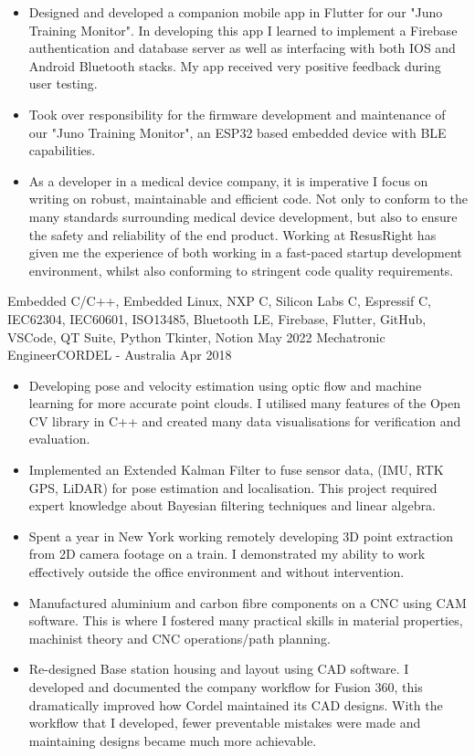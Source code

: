 \begin{experiences}
{\begin{itemize}
			\item Designed and developed a companion mobile app in Flutter for our "Juno Training Monitor". In developing this app I learned to implement a Firebase authentication and database server as well as interfacing with both IOS and Android Bluetooth stacks. My app received very positive feedback during user testing.
			\item Took over responsibility for the firmware development and maintenance of our "Juno Training Monitor", an ESP32 based embedded device with BLE capabilities. 
			\item As a developer in a medical device company, it is imperative I focus on writing on robust, maintainable and efficient code. Not only to conform to the many standards surrounding medical device development, but also to ensure the safety and reliability of the end product. Working at ResusRight has given me the experience of both working in a fast-paced startup development environment, whilst also conforming to stringent code quality requirements.
		\end{itemize}
	}
	{Embedded C/C++, Embedded Linux, NXP \mu C, Silicon Labs \mu C, Espressif \mu C, IEC62304, IEC60601, ISO13485, Bluetooth LE, Firebase, Flutter, GitHub, VSCode, QT Suite, Python Tkinter, Notion}
\emptySeparator
	\experience
		{May 2022}	{Mechatronic Engineer}{CORDEL - Australia}
		{Apr 2018}	{
			\begin{itemize}
				\item Developing pose and velocity estimation using optic flow and machine learning for more accurate point clouds. I utilised many features of the Open CV library in C++ and created many data visualisations for verification and evaluation.
				\item Implemented an Extended Kalman Filter to fuse sensor data, (IMU, RTK GPS, LiDAR) for pose estimation and localisation. This project required expert knowledge about Bayesian filtering techniques and linear algebra.
				\item Spent a year in New York working remotely developing 3D point extraction from 2D camera footage on a train. I demonstrated my ability to work effectively outside the office environment and without intervention.
				\item Manufactured aluminium and carbon fibre components on a CNC using CAM software. This is where I fostered many practical skills in material properties, machinist theory and CNC operations/path planning.
				\item Re-designed Base station housing and layout using CAD software. I developed and documented the company workflow for Fusion 360, this dramatically improved how Cordel maintained its CAD designs. With the workflow that I developed, fewer preventable mistakes were made and maintaining designs became much more achievable.

\end{itemize}}
\end{experiences}
